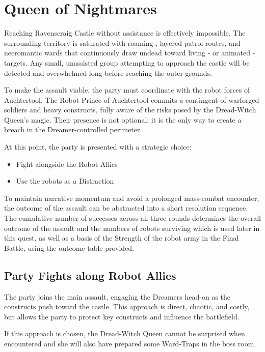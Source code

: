 \section*{Queen of Nightmares}\label{quest:DreadWitchQueen}
{\entryfont Reaching Ravenscraig Castle without assistance is effectively impossible. The surrounding territory is saturated with roaming \hyperref[monster:Dreamer]{}, layered patrol routes, and necromantic wards that continuously draw undead toward living - or animated - targets. Any small, unassisted group attempting to approach the castle will be detected and overwhelmed long before reaching the outer grounds.

To make the assault viable, the party must coordinate with the robot forces of Auchtertool. The Robot Prince of Auchtertool commits a contingent of warforged soldiers and heavy constructs, fully aware of the risks posed by the Dread-Witch Queen's magic. Their presence is not optional; it is the only way to create a breach in the Dreamer-controlled perimeter.

At this point, the party is presented with a strategic choice:
\begin{itemize}
	\item Fight alongside the Robot Allies
	\item Use the robots as a Distraction
\end{itemize}
To maintain narrative momentum and avoid a prolonged mass-combat encounter, the outcome of the assault can be abstracted into a short resolution sequence. The cumulative number of successes across all three rounds determines the overall outcome of the assault and the numbers of robots surviving which is used later in this quest, as well as a basis of the Strength of the robot army in the Final Battle, using the outcome table provided.}

\subsection*{Party Fights along Robot Allies}
{\entryfont The party joins the main assault, engaging the Dreamers head-on as the constructs push toward the castle. This approach is direct, chaotic, and costly, but allows the party to protect key constructs and influence the battlefield.

If this approach is chosen, the Dread-Witch Queen cannot be surprised when encountered and she will also have prepared some Ward-Traps in the boss room.}
